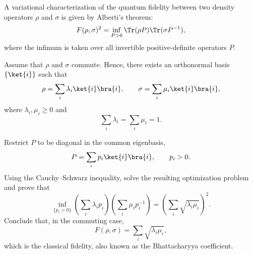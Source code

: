 A variational characterization of the quantum fidelity between two density operators $\rho$ and $\sigma$ is given by Alberti's theorem:
$$
F(\rho,\sigma)^2
=
\inf_{P>0}
\Tr(\rho P)\Tr(\sigma P^{-1}),
$$
where the infimum is taken over all invertible positive-definite operators $P$.

Assume that $\rho$ and $\sigma$ commute. Hence, there exists an orthonormal basis $\{\ket{i}\}$ such that
$$
\rho=\sum_i \lambda_i \ket{i}\bra{i},
\qquad
\sigma=\sum_i \mu_i \ket{i}\bra{i},
$$
where $\lambda_i,\mu_i\geq 0$ and
$$
\sum_i\lambda_i=\sum_i\mu_i=1.
$$

Restrict $P$ to be diagonal in the common eigenbasis,
$$
P=\sum_i p_i \ket{i}\bra{i},
\qquad
p_i>0.
$$
Using the Cauchy--Schwarz inequality, solve the resulting optimization problem and prove that
$$
\inf_{\{p_i>0\}}
\left(
\sum_i \lambda_i p_i
\right)
\left(
\sum_i \mu_i p_i^{-1}
\right)
=
\left(
\sum_i \sqrt{\lambda_i\mu_i}
\right)^2.
$$
Conclude that, in the commuting case,
$$
F(\rho,\sigma)
=
\sum_i \sqrt{\lambda_i\mu_i},
$$
which is the classical fidelity, also known as the Bhattacharyya coefficient.
